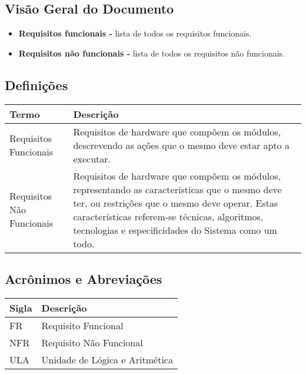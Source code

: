 \documentclass{report}
\begin{document}
\subsection{Visão Geral do Documento}
  \begin{itemize}
   \item \textbf{Requisitos funcionais -} lista de todos os requisitos funcionais.
   \item \textbf{Requisitos não funcionais -} lista de todos os requisitos não funcionais.
  \end{itemize}

  \subsection{Definições}
    \FloatBarrier
    \begin{table}[H]
      \begin{center}
        \begin{tabular}[pos]{|m{5cm} | m{9cm}|} 
          \hline
          \cellcolor[gray]{0.9}\textbf{Termo} & \cellcolor[gray]{0.9}\textbf{Descrição} \\ \hline
          Requisitos Funcionais & Requisitos de hardware que compõem os módulos, descrevendo as ações que o mesmo deve estar apto a executar.   \\ \hline
          Requisitos Não Funcionais & Requisitos de hardware que compõem os módulos, representando as características que o mesmo deve ter, ou restrições que o mesmo deve operar. Estas características referem-se técnicas, algoritmos, tecnologias e especificidades do Sistema como um todo.  \\ \hline
        \end{tabular}
      \end{center}
    \end{table}  

  \subsection{Acrônimos e Abreviações}
    \FloatBarrier
    \begin{table}[H]
      \begin{center}
        \begin{tabular}[pos]{|m{2cm} | m{12cm}|} 
          \hline
          \cellcolor[gray]{0.9}\textbf{Sigla} & \cellcolor[gray]{0.9}\textbf{Descrição} \\ \hline
          FR      & Requisito Funcional  \\ \hline
          NFR     & Requisito Não Funcional  \\ \hline
          ULA     & Unidade de Lógica e Aritmética  \\ \hline
        \end{tabular}
      \end{center}
    \end{table}  
\end{document}
